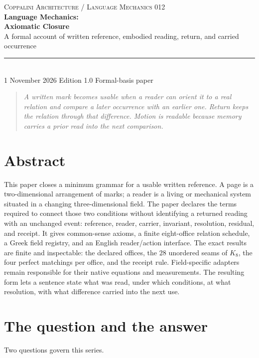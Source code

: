 \documentclass[11pt]{article}
\begin{document}
\begin{center}
{\small\scshape Coppalini Architecture \quad / \quad Language Mechanics 012}\\[2.3em]
{\LARGE\bfseries Language Mechanics:\\[0.16em] Axiomatic Closure}\\[1em]
{\large A formal account of written reference, embodied reading, return, and carried occurrence}\\[2em]
\rule{0.8\textwidth}{0.45pt}\\[1.2em]
{\small 1 November 2026 \quad \textbullet\quad Edition 1.0 \quad \textbullet\quad Formal-basis paper}
\end{center}

\vspace{1.2em}
\begin{quote}\itshape
A written mark becomes usable when a reader can orient it to a real relation and compare a later occurrence with an earlier one. Return keeps the relation through that difference. Motion is readable because memory carries a prior read into the next comparison.
\end{quote}

\section*{Abstract}
This paper closes a minimum grammar for a usable written reference. A page is a two-dimensional arrangement of marks; a reader is a living or mechanical system situated in a changing three-dimensional field. The paper declares the terms required to connect those two conditions without identifying a returned reading with an unchanged event: reference, reader, carrier, invariant, resolution, residual, and receipt. It gives common-sense axioms, a finite eight-office relation schedule, a Greek field registry, and an English reader/action interface. The exact results are finite and inspectable: the declared offices, the $28$ unordered seams of $K_8$, the four perfect matchings per office, and the receipt rule. Field-specific adapters remain responsible for their native equations and measurements. The resulting form lets a sentence state what was read, under which conditions, at what resolution, with what difference carried into the next use.

\section{The question and the answer}
Two questions govern this series.
\end{document}
